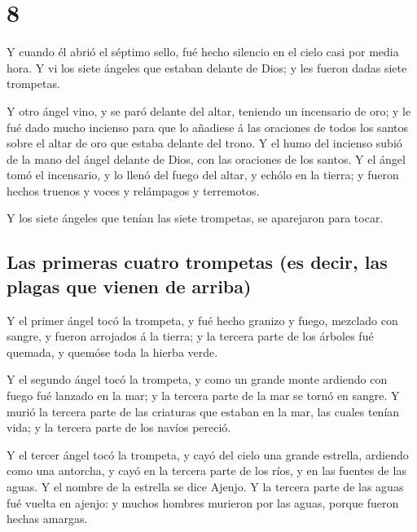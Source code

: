 \hypertarget{section-7}{%
\section{8}\label{section-7}}

 Y cuando él abrió el séptimo sello, fué hecho silencio en
el cielo casi por media hora.  Y vi los siete ángeles que
estaban delante de Dios; y les fueron dadas siete trompetas.

 Y otro ángel vino, y se paró delante del altar, teniendo
un incensario de oro; y le fué dado mucho incienso para que lo añadiese
á las oraciones de todos los santos sobre el altar de oro que estaba
delante del trono.  Y el humo del incienso subió de la
mano del ángel delante de Dios, con las oraciones de los santos.
 Y el ángel tomó el incensario, y lo llenó del fuego del
altar, y echólo en la tierra; y fueron hechos truenos y voces y
relámpagos y terremotos.

 Y los siete ángeles que tenían las siete trompetas, se
aparejaron para tocar.

\hypertarget{las-primeras-cuatro-trompetas-es-decir-las-plagas-que-vienen-de-arriba}{%
\subsection{Las primeras cuatro trompetas (es decir, las plagas que
vienen de
arriba)}\label{las-primeras-cuatro-trompetas-es-decir-las-plagas-que-vienen-de-arriba}}

 Y el primer ángel tocó la trompeta, y fué hecho granizo y
fuego, mezclado con sangre, y fueron arrojados á la tierra; y la tercera
parte de los árboles fué quemada, y quemóse toda la hierba verde.

 Y el segundo ángel tocó la trompeta, y como un grande
monte ardiendo con fuego fué lanzado en la mar; y la tercera parte de la
mar se tornó en sangre.  Y murió la tercera parte de las
criaturas que estaban en la mar, las cuales tenían vida; y la tercera
parte de los navíos pereció.

 Y el tercer ángel tocó la trompeta, y cayó del cielo una
grande estrella, ardiendo como una antorcha, y cayó en la tercera parte
de los ríos, y en las fuentes de las aguas.  Y el nombre
de la estrella se dice Ajenjo. Y la tercera parte de las aguas fué
vuelta en ajenjo: y muchos hombres murieron por las aguas, porque fueron
hechas amargas.

